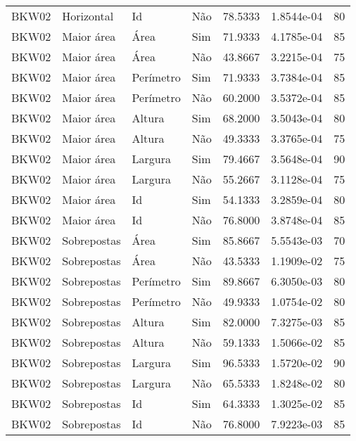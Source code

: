 \begin{tabular}{llllrrr}
BKW02     & Horizontal  & Id        & Não         & 78.5333      & 1.8544e-04 & 80       \\
BKW02     & Maior área  & Área      & Sim         & 71.9333      & 4.1785e-04 & 85       \\
BKW02     & Maior área  & Área      & Não         & 43.8667      & 3.2215e-04 & 75       \\
BKW02     & Maior área  & Perímetro & Sim         & 71.9333      & 3.7384e-04 & 85       \\
BKW02     & Maior área  & Perímetro & Não         & 60.2000      & 3.5372e-04 & 85       \\
BKW02     & Maior área  & Altura    & Sim         & 68.2000      & 3.5043e-04 & 80       \\
BKW02     & Maior área  & Altura    & Não         & 49.3333      & 3.3765e-04 & 75       \\
BKW02     & Maior área  & Largura   & Sim         & 79.4667      & 3.5648e-04 & 90       \\
BKW02     & Maior área  & Largura   & Não         & 55.2667      & 3.1128e-04 & 75       \\
BKW02     & Maior área  & Id        & Sim         & 54.1333      & 3.2859e-04 & 80       \\
BKW02     & Maior área  & Id        & Não         & 76.8000      & 3.8748e-04 & 85       \\
BKW02     & Sobrepostas & Área      & Sim         & 85.8667      & 5.5543e-03 & 70       \\
BKW02     & Sobrepostas & Área      & Não         & 43.5333      & 1.1909e-02 & 75       \\
BKW02     & Sobrepostas & Perímetro & Sim         & 89.8667      & 6.3050e-03 & 80       \\
BKW02     & Sobrepostas & Perímetro & Não         & 49.9333      & 1.0754e-02 & 80       \\
BKW02     & Sobrepostas & Altura    & Sim         & 82.0000      & 7.3275e-03 & 85       \\
BKW02     & Sobrepostas & Altura    & Não         & 59.1333      & 1.5066e-02 & 85       \\
BKW02     & Sobrepostas & Largura   & Sim         & 96.5333      & 1.5720e-02 & 90       \\
BKW02     & Sobrepostas & Largura   & Não         & 65.5333      & 1.8248e-02 & 80       \\
BKW02     & Sobrepostas & Id        & Sim         & 64.3333      & 1.3025e-02 & 85       \\
BKW02     & Sobrepostas & Id        & Não         & 76.8000      & 7.9223e-03 & 85       \\
\hline
\end{tabular}